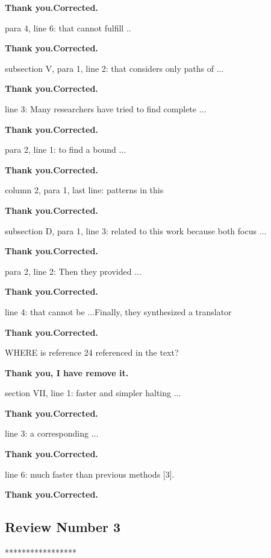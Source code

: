 \documentclass[journal]{IEEEtran}
\begin{document}
{\smallskip
\textbf{Thank you.Corrected.}
\smallskip

                         para 4, line 6: that cannot fulfill ..

\smallskip
\textbf{Thank you.Corrected.}
\smallskip

subsection V, para 1, line 2: that considers only paths of ...

\smallskip
\textbf{Thank you.Corrected.}
\smallskip

                                       line 3: Many researchers have tried to find complete ...

\smallskip
\textbf{Thank you.Corrected.}
\smallskip

                         para 2, line 1: to find a bound ...

\smallskip
\textbf{Thank you.Corrected.}
\smallskip

                        column 2, para 1, last line: patterns in this

\smallskip
\textbf{Thank you.Corrected.}
\smallskip

subsection D, para 1, line 3: related to this work because both focus ...

\smallskip
\textbf{Thank you.Corrected.}
\smallskip

                         para 2, line 2: Then they provided ...

\smallskip
\textbf{Thank you.Corrected.}
\smallskip

                                        line 4: that cannot be ...Finally, they synthesized a translator

\smallskip
\textbf{Thank you.Corrected.}
\smallskip

WHERE is reference 24 referenced in the text?

\smallskip
\textbf{Thank you, I have remove it.}
\smallskip


section VII, line 1: faster and simpler halting ...

\smallskip
\textbf{Thank you.Corrected.}
\smallskip

                     line 3: a corresponding ...

\smallskip
\textbf{Thank you.Corrected.}
\smallskip

                     line 6: much faster than previous methods [3].

\smallskip
\textbf{Thank you.Corrected.}
\smallskip

\subsection{Review Number 3}
*****************

}
\end{document}
